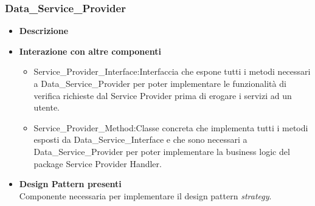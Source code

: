 \subsubsection{Data\_Service\_Provider}
\begin{itemize}
	\item \textbf{Descrizione}
	\item \textbf{Interazione con altre componenti}
	\begin{itemize}
		\item Service\_Provider\_Interface:Interfaccia che espone tutti i metodi necessari a Data\_Service\_Provider per poter implementare le funzionalità di verifica richieste dal Service Provider prima di erogare i servizi ad un utente.
		\item Service\_Provider\_Method:Classe concreta che implementa tutti i metodi esposti da Data\_Service\_Interface e che sono necessari a Data\_Service\_Provider per poter implementare la business logic del package Service Provider Handler.
	\end{itemize}
	\item \textbf{Design Pattern presenti}\\
	Componente necessaria per implementare il design pattern \textit{strategy}.
\end{itemize}